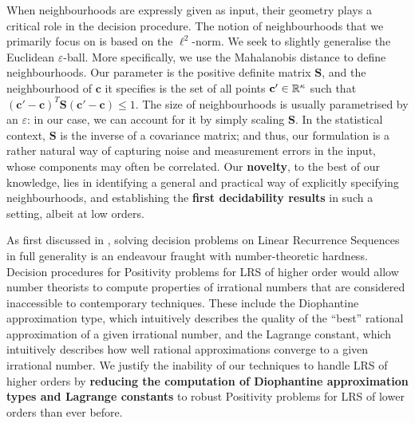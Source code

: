 When neighbourhoods are expressly given as input, their geometry plays a critical role in the decision procedure. The notion of neighbourhoods that we primarily focus on is based on the $\ell^2$-norm. We seek to slightly generalise the Euclidean $\varepsilon$-ball. More specifically, we use the Mahalanobis distance to define neighbourhoods. Our parameter is the positive definite matrix $\mathbf{S}$, and the neighbourhood of $\mathbf{c}$ it specifies is the set of all points $\mathbf{c'} \in \mathbb{R}^{\kappa}$ such that $(\mathbf{c'} - \mathbf{c})^T\mathbf{S}(\mathbf{c'} - \mathbf{c}) \le 1$. The size of neighbourhoods is usually parametrised by an $\varepsilon$: in our case, we can account for it by simply scaling $\mathbf{S}$. In the statistical context, $\mathbf{S}$ is the inverse of a covariance matrix; and thus, our formulation is a rather natural way of capturing noise and measurement errors in the input, whose components may often be correlated. Our \textbf{novelty}, to the best of our knowledge, lies in identifying a general and practical way of explicitly specifying neighbourhoods, and establishing the \textbf{first decidability results} in such a setting, albeit at low orders. 

As first discussed in \cite[Section 5]{joeljames3}, solving decision problems on Linear Recurrence Sequences in full generality is an endeavour fraught with number-theoretic hardness. Decision procedures for Positivity problems for LRS of higher order would allow number theorists to compute properties of irrational numbers that are considered inaccessible to contemporary techniques. These include the Diophantine approximation type, which intuitively describes the quality of the ``best'' rational approximation of a given irrational number, and the Lagrange constant, which intuitively describes how well rational approximations converge to a given irrational number. We justify the inability of our techniques to handle LRS of higher orders by \textbf{reducing the computation of Diophantine approximation types and Lagrange constants} to robust Positivity problems for LRS of lower orders than ever before.

